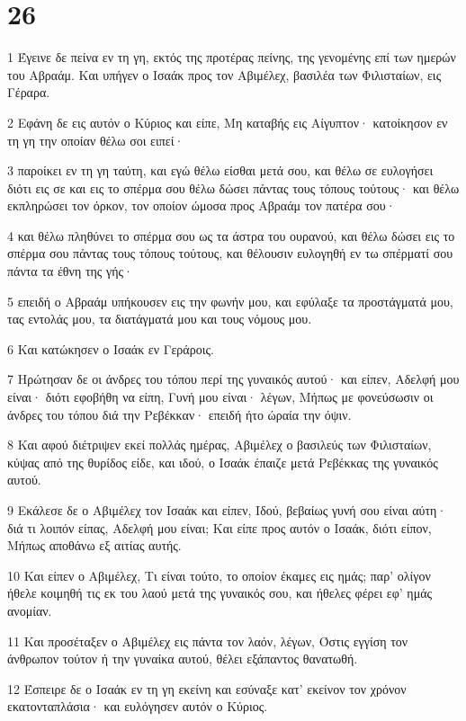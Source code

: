 \chapter{26}

\par 1 Έγεινε δε πείνα εν τη γη, εκτός της προτέρας πείνης, της γενομένης επί των ημερών του Αβραάμ. Και υπήγεν ο Ισαάκ προς τον Αβιμέλεχ, βασιλέα των Φιλισταίων, εις Γέραρα.
\par 2 Εφάνη δε εις αυτόν ο Κύριος και είπε, Μη καταβής εις Αίγυπτον· κατοίκησον εν τη γη την οποίαν θέλω σοι ειπεί·
\par 3 παροίκει εν τη γη ταύτη, και εγώ θέλω είσθαι μετά σου, και θέλω σε ευλογήσει διότι εις σε και εις το σπέρμα σου θέλω δώσει πάντας τους τόπους τούτους· και θέλω εκπληρώσει τον όρκον, τον οποίον ώμοσα προς Αβραάμ τον πατέρα σου·
\par 4 και θέλω πληθύνει το σπέρμα σου ως τα άστρα του ουρανού, και θέλω δώσει εις το σπέρμα σου πάντας τους τόπους τούτους, και θέλουσιν ευλογηθή εν τω σπέρματί σου πάντα τα έθνη της γής·
\par 5 επειδή ο Αβραάμ υπήκουσεν εις την φωνήν μου, και εφύλαξε τα προστάγματά μου, τας εντολάς μου, τα διατάγματά μου και τους νόμους μου.
\par 6 Και κατώκησεν ο Ισαάκ εν Γεράροις.
\par 7 Ηρώτησαν δε οι άνδρες του τόπου περί της γυναικός αυτού· και είπεν, Αδελφή μου είναι· διότι εφοβήθη να είπη, Γυνή μου είναι· λέγων, Μήπως με φονεύσωσιν οι άνδρες του τόπου διά την Ρεβέκκαν· επειδή ήτο ώραία την όψιν.
\par 8 Και αφού διέτριψεν εκεί πολλάς ημέρας, Αβιμέλεχ ο βασιλεύς των Φιλισταίων, κύψας από της θυρίδος είδε, και ιδού, ο Ισαάκ έπαιζε μετά Ρεβέκκας της γυναικός αυτού.
\par 9 Εκάλεσε δε ο Αβιμέλεχ τον Ισαάκ και είπεν, Ιδού, βεβαίως γυνή σου είναι αύτη· διά τι λοιπόν είπας, Αδελφή μου είναι; Και είπε προς αυτόν ο Ισαάκ, διότι είπον, Μήπως αποθάνω εξ αιτίας αυτής.
\par 10 Και είπεν ο Αβιμέλεχ, Τι είναι τούτο, το οποίον έκαμες εις ημάς; παρ' ολίγον ήθελε κοιμηθή τις εκ του λαού μετά της γυναικός σου, και ήθελες φέρει εφ' ημάς ανομίαν.
\par 11 Και προσέταξεν ο Αβιμέλεχ εις πάντα τον λαόν, λέγων, Όστις εγγίση τον άνθρωπον τούτον ή την γυναίκα αυτού, θέλει εξάπαντος θανατωθή.
\par 12 Έσπειρε δε ο Ισαάκ εν τη γη εκείνη και εσύναξε κατ' εκείνον τον χρόνον εκατονταπλάσια· και ευλόγησεν αυτόν ο Κύριος.
